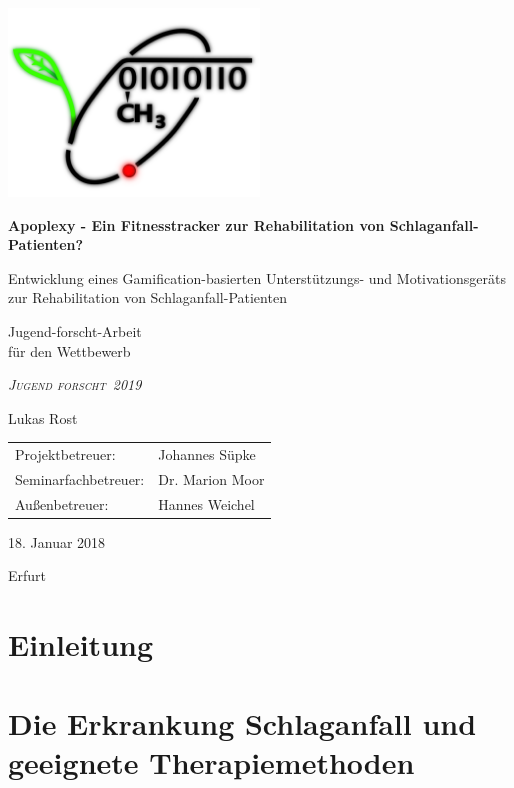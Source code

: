 \documentclass[a4paper, 11pt, titlepage, bibliography=totocnumbered]{scrartcl}
\begin{document}
\begin{titlepage}
	\centering
	\includegraphics[width=0.5\textwidth]{pics/logo}\par\vspace{1cm}
	{\huge\bfseries Apoplexy - Ein Fitnesstracker zur Rehabilitation von Schlaganfall-Patienten? \par}
	\vspace{0.3cm}
	{\large Entwicklung eines Gamification-basierten Unterstützungs- und Motivationsgeräts zur Rehabilitation von Schlaganfall-Patienten \par}
	\vspace{2cm}
	{\Large Jugend-forscht-Arbeit\\ \large für den Wettbewerb \\}
		{\scshape\Large\itshape \glqq Jugend forscht\grqq ~2019 \par}
	\vspace{2cm}
	{\Large Lukas Rost}
	\vfill
	{\begin{tabular}{ll}
	\Large Projektbetreuer: & \Large Johannes Süpke \\[5pt]
	\Large Seminarfachbetreuer: & \Large Dr. Marion Moor \\[5pt]
	\Large Außenbetreuer: & \Large Hannes Weichel \\
	\end{tabular}}
	\vfill
	{\Large 18. Januar 2018\par Erfurt}
\end{titlepage}

\newpage

\tableofcontents
\setcounter{page}{1}
\newpage

\section{Einleitung}


\newpage
\section{Die Erkrankung Schlaganfall und geeignete Therapiemethoden}

\end{document}
